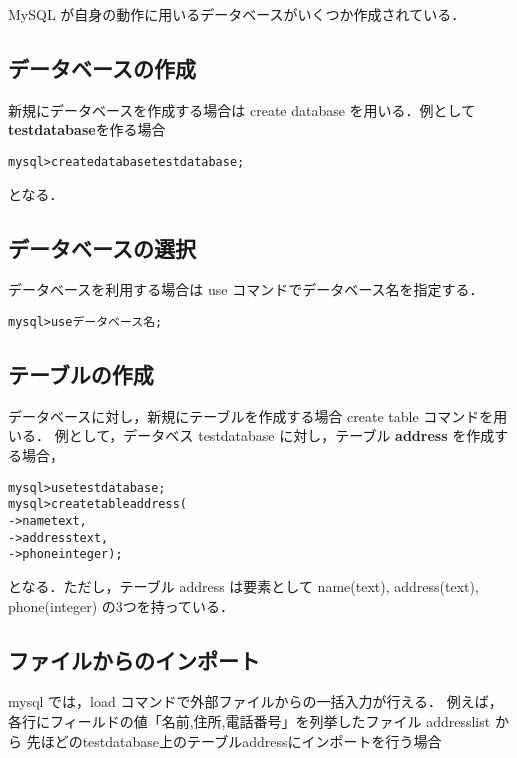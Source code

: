 MySQL が自身の動作に用いるデータベースがいくつか作成されている．
	
\subsection*{データベースの作成}
新規にデータベースを作成する場合は create database を用いる．例として\textbf{testdatabase}を作る場合
	\begin{center}
	\begin{breakbox}
	\begin{alltt}
		mysql> create database testdatabase;
	\end{alltt}
	\end{breakbox}
	\end{center}
となる．

\subsection*{データベースの選択}
データベースを利用する場合は use コマンドでデータベース名を指定する．
	\begin{center}
	\begin{breakbox}
	\begin{alltt}
		mysql> use データベース名;
	\end{alltt}
	\end{breakbox}
	\end{center}

\subsection*{テーブルの作成}
データベースに対し，新規にテーブルを作成する場合 create table コマンドを用いる．
例として，データベス testdatabase に対し，テーブル \textbf{address} を作成する場合，

	\begin{center}
	\begin{breakbox}
	\begin{alltt}
		mysql> use testdatabase;
		mysql> create table address (
		    -> name text,
		    -> address text,
		    -> phone integer );
	\end{alltt}
	\end{breakbox}
	\end{center}
となる．ただし，テーブル address は要素として name(text), address(text), phone(integer) の3つを持っている．
	
\subsection*{ファイルからのインポート}
mysql では，load コマンドで外部ファイルからの一括入力が行える．
例えば，各行にフィールドの値「名前,住所,電話番号」を列挙したファイル addresslist から
先ほどのtestdatabase上のテーブルaddressにインポートを行う場合

